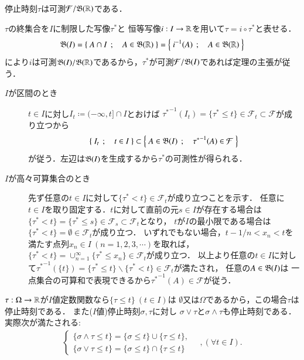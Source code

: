 	\begin{screen}
		\begin{thm}[停止時刻は可測写像]
			停止時刻$\tau$は可測$\mathcal{F}/\mathfrak{B}(\mathbb{R})$である．
		\end{thm}
	\end{screen}
	
	\begin{prf}
		$\tau$の終集合を$I$に制限した写像$\tau^*$と
		恒等写像$i:I \rightarrow \mathbb{R}$を用いて$\tau = i \circ \tau^*$と表せる．
		\begin{align}
			\mathfrak{B}(I)=\left\{\ A \cap I\ \, ; \quad A \in \mathfrak{B}(\mathbb{R})\ \right\} = \left\{\ i^{-1}(A)\ \, ; \quad A \in \mathfrak{B}(\mathbb{R})\ \right\}
		\end{align}
		により$i$は可測$\mathfrak{B}(I)/\mathfrak{B}(\mathbb{R})$であるから，$\tau^*$が可測$\mathcal{F}/\mathfrak{B}(I)$であれば定理の主張が従う．
		\begin{description}
			\item[$I$が区間のとき]
				$t \in I$に対し$I_t \coloneqq (-\infty,t] \cap I$とおけば
				${\tau^*}^{-1}(I_t) = \{ \tau^* \leq t \} \in \mathcal{F}_t \subset \mathcal{F}$が成り立つから
				\begin{align}
					\left\{\ I_t\ \, ; \quad t \in I\ \right\} \subset \left\{\ A \in \mathfrak{B}(I)\ \, ; \quad {\tau^*}^{-1}(A) \in \mathcal{F}\ \right\}
					\label{eq:stopping_time_mble}
				\end{align}
				が従う．左辺は$\mathfrak{B}(I)$を生成するから$\tau^*$の可測性が得られる．
				
			\item[$I$が高々可算集合のとき]
				先ず任意の$t \in I$に対して$\{ \tau^* < t \} \in \mathcal{F}_t$が成り立つことを示す．
				任意に$t \in I$を取り固定する．$t$に対して直前の元$s \in I$が存在する場合は
				$\{ \tau^* < t \} = \{ \tau^* \leq s \} \in \mathcal{F}_s \subset \mathcal{F}_t$となり，
				$t$が$I$の最小限である場合は$\{ \tau^* < t \} = \emptyset \in \mathcal{F}_t$が成り立つ．
				いずれでもない場合，$t - 1/n < x_n < t$を満たす点列$x_n \in I\ (n=1,2,3,\cdots)$を取れば，
				$\{ \tau^* < t \} = \cup_{n=1}^{\infty}\{ \tau^* \leq x_n \} \in \mathcal{F}_t$が成り立つ．
				以上より任意の$t \in I$に対して${\tau^*}^{-1}(\{t\}) = \{ \tau^* \leq t \} \backslash \{ \tau^* < t \} \in \mathcal{F}_t$が満たされ，
				任意の$A \in \mathfrak{B}(I)$は
				一点集合の可算和で表現できるから${\tau^*}^{-1}(A) \in \mathcal{F}$が従う．
				\QED
		\end{description}
	\end{prf}
	
	$\tau:\Omega \rightarrow \mathbb{R}$が$I$値定数関数なら$\{\tau \leq t\}\ (t \in I)$は
	$\emptyset$又は$\Omega$であるから，この場合$\tau$は停止時刻である．
	また($I$値)停止時刻$\sigma,\tau$に対し
	$\sigma \vee \tau$と$\sigma \wedge \tau$も停止時刻である．実際次が満たされる:
	\begin{align}
		\begin{cases}
			\{ \sigma \wedge \tau \leq t \} = \{ \sigma \leq t \} \cup \{ \tau \leq t \}, \\
			\{ \sigma \vee \tau \leq t \} = \{ \sigma \leq t \} \cap \{ \tau \leq t \}
		\end{cases}
		\quad ,(\forall t \in I).
	\end{align}
	
